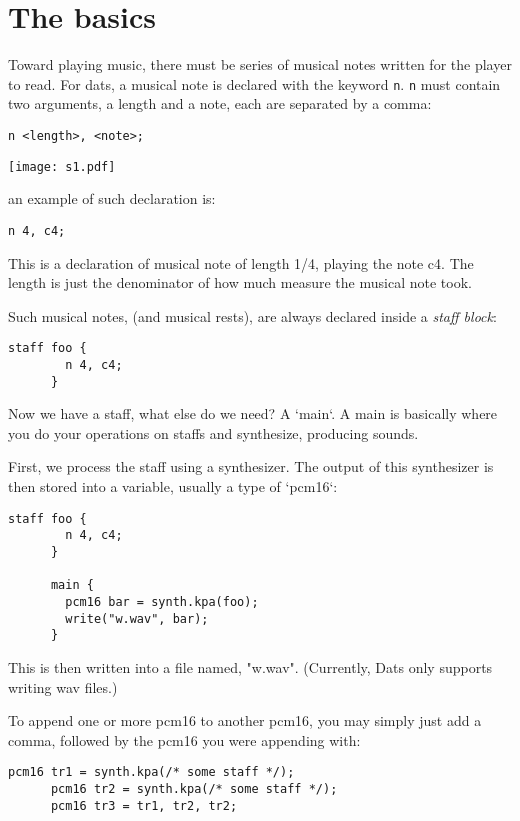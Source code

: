 \section{The basics}

\np Toward playing music, there must be series of musical notes written for the player to read.
For dats, a musical note is declared with the keyword \verb+n+. \verb+n+ must contain two arguments,
a length and a note, each are separated by a comma:


\begin{Verbatim}[frame=single]
       n <length>, <note>;
\end{Verbatim}

\begin{center}
\color{blue}
\texttt{[image: s1.pdf]}
\end{center}

\np an example of such declaration is:
\begin{Verbatim}[frame=single]
       n 4, c4;
\end{Verbatim}

This is a declaration of musical note of length 1/4, playing the note c4. The length
is just the denominator of how much measure the musical note took.

\np Such musical notes, (and musical rests), are always declared inside a \textit{staff block}:

\begin{Verbatim}[frame=single]
      staff foo {
        n 4, c4;
      }
\end{Verbatim}

\np Now we have a staff, what else do we need? A `main`. A main is basically
where you do your operations on staffs and synthesize, producing sounds.

\np First, we process the staff using a synthesizer. The output of this synthesizer
is then stored into a variable, usually a type of `pcm16`:

\begin{Verbatim}[frame=single]
      staff foo {
        n 4, c4;
      }

      main {
        pcm16 bar = synth.kpa(foo);
        write("w.wav", bar);
      }
\end{Verbatim}

\np This is then written into a file named, "w.wav". (Currently, Dats only supports writing wav files.)

\np To append one or more pcm16 to another pcm16, you may simply just add a comma, followed by the pcm16
you were appending with:

\begin{Verbatim}[frame=single]
      pcm16 tr1 = synth.kpa(/* some staff */);
      pcm16 tr2 = synth.kpa(/* some staff */);
      pcm16 tr3 = tr1, tr2, tr2;
\end{Verbatim}
